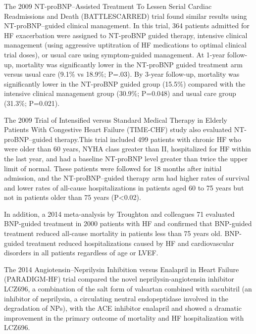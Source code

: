 \documentclass[14pt,a4paper,onecolumn]{extarticle}
\begin{document}
The 2009 NT-proBNP–Assisted Treatment To Lessen Serial Cardiac Readmissions and Death (BATTLESCARRED) trial found similar results using NT-proBNP–guided clinical management. In this trial, 364 patients admitted for HF exacerbation were assigned to NT-proBNP guided therapy, intensive clinical management (using aggressive uptitration of HF medications to optimal clinical trial doses), or usual care using symptom-guided management. At 1-year follow-up, mortality was significantly lower in the NT-proBNP guided treatment arm versus usual care (9.1\% vs 18.9\%; P=.03). By 3-year follow-up, mortality was significantly lower in the NT-proBNP guided group (15.5\%) compared with the intensive clinical management group (30.9\%; P=0.048) and usual care group (31.3\%; P=0.021). \citep{Lainchbury2009} %

The 2009 Trial of Intensified versus Standard Medical Therapy in Elderly Patients With Congestive Heart Failure (TIME-CHF) study also evaluated NT-proBNP–guided therapy.This trial included 499 patients with chronic HF who were older than 60 years, NYHA class greater than II, hospitalized for HF within the last year, and had a baseline NT-proBNP level greater than twice the upper limit of normal. These patients were followed for 18 months after initial admission, and the NT-proBNP–guided therapy arm had higher rates of survival and lower rates of all-cause hospitalizations in patients aged 60 to 75 years but not in patients older than 75 years (P<0.02). \citep{Pfisterer2009} %

In addition, a 2014 meta-analysis by Troughton and colleagues 71 evaluated BNP-guided treatment in 2000 patients with HF and confirmed that BNP-guided treatment reduced all-cause mortality in patients less than 75 years old. BNP-guided treatment reduced hospitalizations caused by HF and cardiovascular disorders in all patients regardless of age or LVEF. \citep{Troughton2014} %

The 2014 Angiotensin–Neprilysin Inhibition versus Enalapril in Heart Failure (PARADIGM-HF) trial compared the novel neprilysin-angiotensin inhibitor LCZ696, a combination of the salt form of valsartan combined with sacubitril (an inhibitor of neprilysin, a circulating neutral endopeptidase involved in the degradation of NPs), with the ACE inhibitor enalapril and showed a dramatic improvement in the primary outcome of mortality and HF hospitalization with LCZ696. \citep{McMurray2014} %
\end{document}
